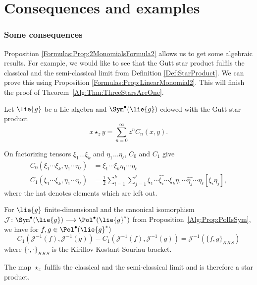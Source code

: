 \section{Consequences and examples}
\label{sec:chap4_Consequences}

\subsubsection*{Some consequences}
Proposition \ref{Formulas:Prop:2MonomialsFormula2} allows us to get some 
algebraic results. For example, we would like to see that the Gutt star 
product fulfils the classical and the semi-classical limit from Definition 
\ref{Def:StarProduct}. We can prove this using Proposition 
\ref{Formulas:Prop:LinearMonomial2}. This will finish the proof of 
Theorem~\ref{Alg:Thm:ThreeStarsAreOne}.
\begin{corollary}
	\label{Formulas:Cor:LimitCases}
	Let $\lie{g}$ be a Lie algebra and $\Sym^{\bullet}(\lie{g})$ edowed with 
	the Gutt star product
	\begin{equation*}
		x \star_z y
		= 
		\sum\limits_{n = 0}^{\infty}
		z^n C_n(x,y).
	\end{equation*}	
	\begin{corollarylist}
		\item
		On factorizing tensors $\xi_1 \ldots \xi_k$ and $\eta_1 \ldots 
		\eta_{\ell}$, $C_0$ and $C_1$ give
		\begin{align}
			\label{Formulas:ClassicalLimit}
			C_0 \left(
				\xi_1 \cdots \xi_k, \eta_1 \cdots \eta_{\ell}
			\right)
			& = 
			\xi_1 \cdots \xi_k \eta_1 \cdots \eta_{\ell}
			\\
			\label{Formulas:SemiClassicalLimit}
			C_1 \left(
				\xi_1 \cdots \xi_k, \eta_1 \cdots \eta_{\ell}
			\right)
				& =
			\frac{1}{2}	
			\sum\limits_{i = 1}^k
			\sum\limits_{j = 1}^{\ell}
			\xi_1 \cdots \widehat{\xi_i} \cdots \xi_k
			\eta_1 \cdots \widehat{\eta_j} \cdots \eta_{\ell}
			[\xi_i \eta_j],
		\end{align}
		where the hat denotes elements which are left out.
		
		\item
		For $\lie{g}$ finite-dimensional and the canonical isomorphism 
		$\mathcal{J} \colon \Sym^{\bullet}(\lie{g}) \longrightarrow 
		\Pol^{\bullet}(\lie{g}^*)$ from Proposition~\ref{Alg:Prop:PolIsSym},
		we have for $f,g \in \Pol^{\bullet}(\lie{g}^*)$
		\begin{equation*}
			C_1 \left(
				\mathcal{J}^{-1} (f),
				\mathcal{J}^{-1} (g)
			\right)
			-
			C_1 \left(
				\mathcal{J}^{-1} (f),
				\mathcal{J}^{-1} (g)
			\right)
			= 
			\mathcal{J}^{-1} \left( 
				\{ f, g \}_{KKS}
			\right)
		\end{equation*}
		where $\{ \cdot, \cdot \}_{KKS}$ is the Kirillov-Kostant-Souriau 
		bracket.
		
		\item
		The map $\star_z$ fulfils the classical and the semi-classical limit 
		and is therefore a star product.
	\end{corollarylist}
\end{corollary}
